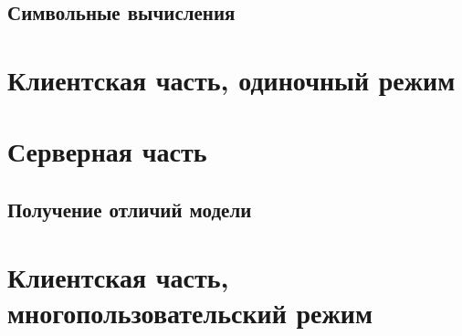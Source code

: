 \TODO

\subsection{Символьные вычисления}\label{expr}

\TODO

\section{Клиентская часть, одиночный режим}

\TODO

\section{Серверная часть}

\subsection{Получение отличий модели}\label{model-diff-implementation}

\TODO

\section{Клиентская часть, многопользовательский режим}

\TODO
